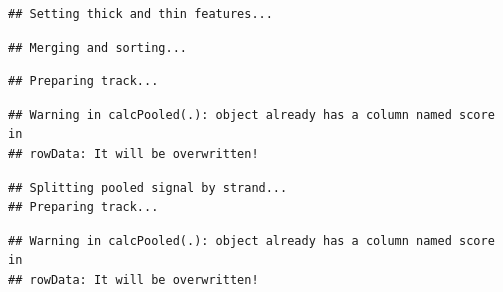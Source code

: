 \documentclass[9pt,a4paper,]{extarticle}
\newenvironment{Shaded}{\begin{snugshade}}{\end{snugshade}}
\newcommand{\KeywordTok}[1]{\textcolor[rgb]{0.13,0.29,0.53}{\textbf{{#1}}}}
\newcommand{\DataTypeTok}[1]{\textcolor[rgb]{0.13,0.29,0.53}{{#1}}}
\newcommand{\StringTok}[1]{\textcolor[rgb]{0.31,0.60,0.02}{{#1}}}
\newcommand{\CommentTok}[1]{\textcolor[rgb]{0.56,0.35,0.01}{\textit{{#1}}}}
\newcommand{\NormalTok}[1]{{#1}}
\begin{document}
\begin{verbatim}
## Setting thick and thin features...
\end{verbatim}

\begin{verbatim}
## Merging and sorting...
\end{verbatim}

\begin{verbatim}
## Preparing track...
\end{verbatim}

\begin{Shaded}
\end{Shaded}

\begin{verbatim}
## Warning in calcPooled(.): object already has a column named score in
## rowData: It will be overwritten!
\end{verbatim}

\begin{verbatim}
## Splitting pooled signal by strand...
## Preparing track...
\end{verbatim}

\begin{Shaded}
\end{Shaded}

\begin{verbatim}
## Warning in calcPooled(.): object already has a column named score in
## rowData: It will be overwritten!
\end{verbatim}
\end{document}
